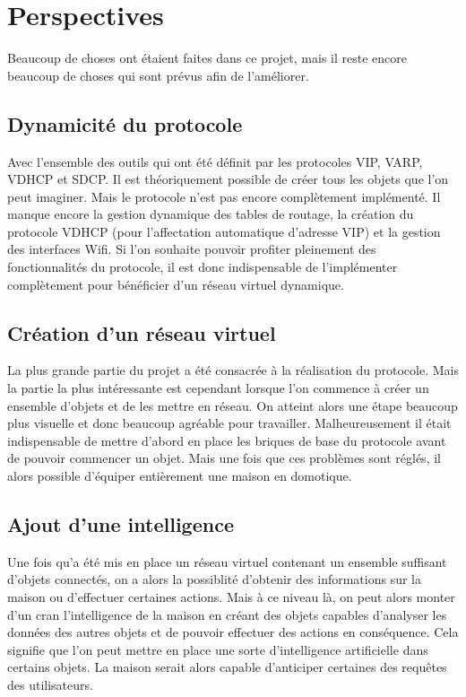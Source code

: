 \chapter*{Perspectives}

Beaucoup de choses ont étaient faites dans ce projet, mais il reste encore beaucoup de choses qui sont prévus 
afin de l'améliorer.

\section*{Dynamicité du protocole}
	Avec l'ensemble des outils qui ont été définit par les protocoles VIP, VARP, VDHCP et SDCP. Il 
	est théoriquement possible de créer tous les objets que l'on peut imaginer. Mais le protocole
	n'est pas encore complètement implémenté. Il manque encore la gestion dynamique des tables de
	routage, la création du protocole VDHCP (pour l'affectation automatique d'adresse VIP) et la 
	gestion des interfaces Wifi. Si l'on souhaite pouvoir profiter pleinement des fonctionnalités
	du protocole, il est donc indispensable de l'implémenter complètement pour bénéficier d'un
	réseau virtuel dynamique.

\section*{Création d'un réseau virtuel}
	La plus grande partie du projet a été consacrée à la réalisation du protocole. Mais la partie
	la plus intéressante est cependant lorsque l'on commence à créer un ensemble d'objets et de les
	mettre en réseau. On atteint alors une étape beaucoup plus visuelle et donc beaucoup agréable 
	pour travailler. Malheureusement il était indispensable de mettre d'abord en place les briques
	de base du protocole avant de pouvoir commencer un objet. Mais une fois que ces problèmes sont
	réglés, il alors possible d'équiper entièrement une maison en domotique.

\section*{Ajout d'une intelligence}
	Une fois qu'a été mis en place un réseau virtuel contenant un ensemble suffisant d'objets 
	connectés, on a alors la possiblité d'obtenir des informations sur la maison ou d'effectuer
	certaines actions. Mais à ce niveau là, on peut alors monter d'un cran l'intelligence de la
	maison en créant des objets capables d'analyser les données des autres objets et de pouvoir
	effectuer des actions en conséquence. Cela signifie que l'on peut mettre en place une sorte
	d'intelligence artificielle dans certains objets. La maison serait alors capable d'anticiper
	certaines des requêtes des utilisateurs.

